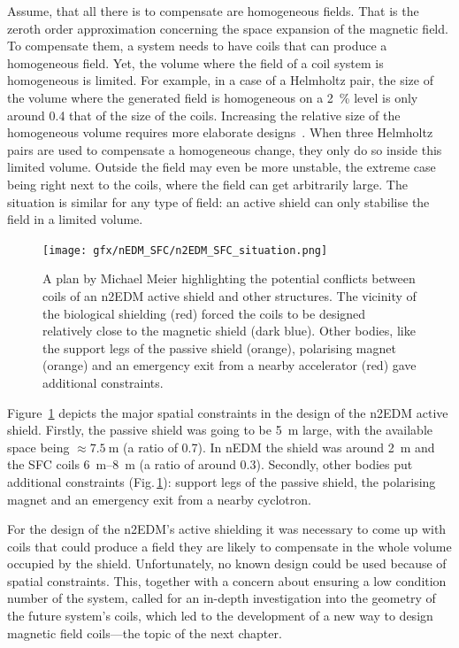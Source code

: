  Assume, that all there is to compensate are homogeneous fields. That is the zeroth order approximation concerning the space expansion of the magnetic field. To compensate them, a system needs to have coils that can produce a homogeneous field. Yet, the volume where the field of a coil system is homogeneous is limited. For example, in a case of a Helmholtz pair, the size of the volume where the generated field is homogeneous on a \SI{2}{\percent} level is only around \num{0.4} that of the size of the coils. Increasing the relative size of the homogeneous volume requires more elaborate designs~\cite{Kirschvink1992}. When three Helmholtz pairs are used to compensate a homogeneous change, they only do so inside this limited volume. Outside the field may even be more unstable, the extreme case being right next to the coils, where the field can get arbitrarily large. The situation is similar for any type of field: an active shield can only stabilise the field in a limited volume.

\begin{figure}
  \centering
  \texttt{[image: gfx/nEDM\_SFC/n2EDM\_SFC\_situation.png]}
  \caption{A plan by Michael Meier highlighting the potential conflicts between coils of an n2EDM active shield and other structures. The vicinity of the biological shielding (red) forced the coils to be designed relatively close to the magnetic shield (dark blue). Other bodies, like the support legs of the passive shield (orange), polarising magnet (orange) and an emergency exit from a nearby accelerator (red) gave additional constraints.}\label{fig:n2EDM_sfc_situational_plan}
\end{figure}

Figure~\ref{fig:n2EDM_sfc_situational_plan} depicts the major spatial constraints in the design of the n2EDM active shield. Firstly, the passive shield was going to be \SI{5}{\metre} large, with the available space being $\approx \SI{7.5}{\metre}$ (a ratio of \num{0.7}). In nEDM the shield was around \SI{2}{\meter} and the SFC coils \SIrange[range-phrase = --, range-units=single]{6}{8}{\meter} (a ratio of around 0.3). Secondly, other bodies put additional constraints (Fig.\,\ref{fig:n2EDM_sfc_situational_plan}): support legs of the passive shield, the polarising magnet and an emergency exit from a nearby cyclotron.

For the design of the n2EDM's active shielding it was necessary to come up with coils that could produce a field they are likely to compensate in the whole volume occupied by the shield. Unfortunately, no known design could be used because of spatial constraints. This, together with a concern about ensuring a low condition number of the system, called for an in-depth investigation into the geometry of the future system's coils, which led to the development of a new way to design magnetic field coils---the topic of the next chapter.

